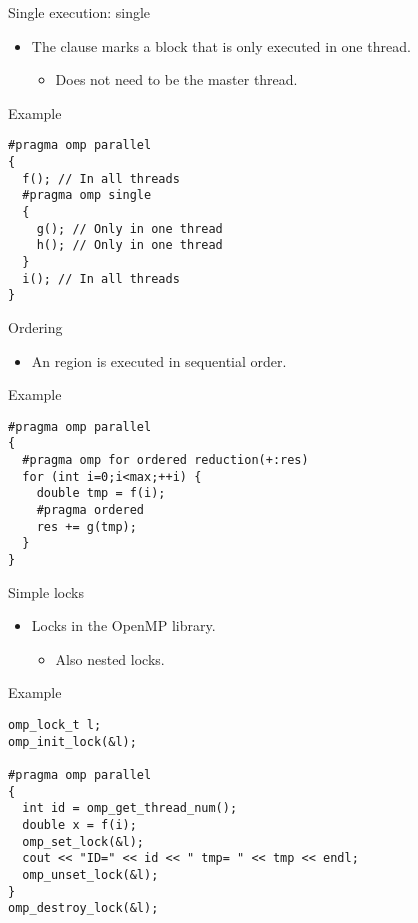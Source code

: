 \begin{frame}[t,fragile]{Single execution: single}
\begin{itemize}
  \item The  clause marks a block that is only 
        executed in one thread.
    \begin{itemize}
      \item Does not need to be the master thread.
    \end{itemize}
\end{itemize}
\begin{block}{Example}
\begin{lstlisting}
#pragma omp parallel
{
  f(); // In all threads
  #pragma omp single
  {
    g(); // Only in one thread
    h(); // Only in one thread
  }
  i(); // In all threads
}
\end{lstlisting}
\end{block}
\end{frame}

\begin{frame}[t,fragile]{Ordering}
\begin{itemize}
  \item An  region is executed in sequential order.
\end{itemize}
\begin{block}{Example}
\begin{lstlisting}
#pragma omp parallel
{
  #pragma omp for ordered reduction(+:res)
  for (int i=0;i<max;++i) {
    double tmp = f(i);
    #pragma ordered
    res += g(tmp);
  }
}
\end{lstlisting}
\end{block}

\end{frame}

\begin{frame}[t,fragile]{Simple locks}
\begin{itemize}
  \item Locks in the OpenMP library.
    \begin{itemize}
      \item Also nested locks.
    \end{itemize}
\end{itemize}
\begin{block}{Example}
\begin{lstlisting}
omp_lock_t l;
omp_init_lock(&l);

#pragma omp parallel
{
  int id = omp_get_thread_num();
  double x = f(i);
  omp_set_lock(&l);
  cout << "ID=" << id << " tmp= " << tmp << endl;
  omp_unset_lock(&l);
}
omp_destroy_lock(&l);
\end{lstlisting}
\end{block}
\end{frame}

